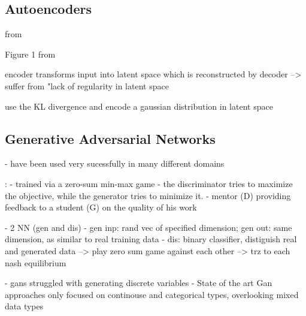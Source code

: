 \subsection{Autoencoders}
\label{ch:preliminaries-generativeAlgorithms-variationalAutoencoders}

from \cite{kingma2013AutoEncodingVariationalBayes}

Figure 1 from \cite{razghandi2022VariationalAutoencoderGenerativea}

encoder transforms input into latent space which is reconstructed by decoder \cite{razghandi2022VariationalAutoencoderGenerativea}
--> suffer from "lack of regularity in latent space \cite{razghandi2022VariationalAutoencoderGenerativea}

use the KL divergence and encode a gaussian distribution in latent space \cite{razghandi2022VariationalAutoencoderGenerativea}


\subsection{Generative Adversarial Networks}
\label{ch:preliminaries-generativeAlgorithms-generativeAdversarialNetworks}

\cite{goodfellow2020GenerativeAdversarialNetworks}
- have been used very sucessfully in many different domains \cite{li2022TTSGANTransformerbasedTimeSeries}
 

\cite{zhao2022CTABGANEnhancingTabular}:
- trained via a zero-sum min-max game 
- the discriminator tries to maximize the objective, while the generator tries to minimize it.
- mentor (D) providing feedback to a student (G) on the quality of his work


\cite{li2022TTSGANTransformerbasedTimeSeries}
- 2 NN (gen and dis)
- gen inp: rand vec of specified dimension; gen out: same dimension, as similar to real training data
- dis: binary classifier, distiguish real and generated data
--> play zero sum game against each other
--> trz to each nash equilibrium

- gans struggled with generating discrete variables \cite{torfi2020CorGANCorrelationCapturingConvolutionala}
- State of the art Gan approaches only focused on continouse and categorical types, overlooking mixed data types \cite{zhao2022CTABGANEnhancingTabular}


